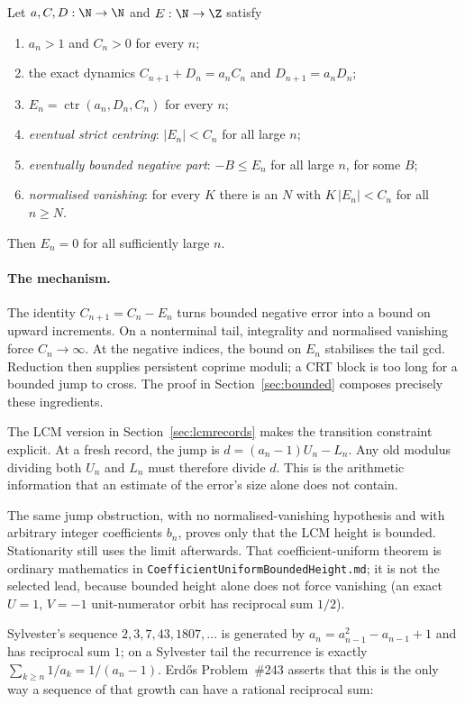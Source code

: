\documentclass[11pt]{article}
\newcommand{\ctr}{\operatorname{ctr}}
\begin{document}
\begin{theorem}\label{res:bounded}
Let $a,C,D:\N\to\N$ and $E:\N\to\Z$ satisfy
\begin{enumerate}
\item $a_n>1$ and $C_n>0$ for every $n$;
\item the exact dynamics $C_{n+1}+D_n=a_nC_n$ and $D_{n+1}=a_nD_n$;
\item $E_n=\ctr(a_n,D_n,C_n)$ for every $n$;
\item \emph{eventual strict centring}: $|E_n|<C_n$ for all large $n$;
\item \emph{eventually bounded negative part}: $-B\le E_n$ for all large $n$,
for some $B$;
\item \emph{normalised vanishing}: for every $K$ there is an $N$ with
$K\,|E_n|<C_n$ for all $n\ge N$.
\end{enumerate}
Then $E_n=0$ for all sufficiently large $n$.
\end{theorem}


\paragraph{The mechanism.}
The identity $C_{n+1}=C_n-E_n$ turns bounded negative error into a bound on
upward increments.  On a nonterminal tail, integrality and normalised
vanishing force $C_n\to\infty$.  At the negative indices, the bound on $E_n$
stabilises the tail gcd.  Reduction then supplies persistent coprime moduli;
a CRT block is too long for a bounded jump to cross.  The proof in
Section~\ref{sec:bounded} composes precisely these ingredients.

The LCM version in Section~\ref{sec:lcmrecords} makes the transition
constraint explicit.  At a fresh record, the jump is
$d=(a_n-1)U_n-L_n$.  Any old modulus dividing both $U_n$ and $L_n$ must
therefore divide $d$.  This is the arithmetic information that an estimate
of the error's size alone does not contain.

The same jump obstruction, with no normalised-vanishing hypothesis and with
arbitrary integer coefficients $b_n$, proves only that the LCM height is
bounded.  Stationarity still uses the limit afterwards.  That
coefficient-uniform theorem is ordinary mathematics in
\texttt{CoefficientUniformBoundedHeight.md}; it is not the selected lead,
because bounded height alone does not force vanishing (an exact $U=1$,
$V=-1$ unit-numerator orbit has reciprocal sum $1/2$).


Sylvester's sequence $2,3,7,43,1807,\ldots$ is generated by
$a_{n}=a_{n-1}^{2}-a_{n-1}+1$ and has reciprocal sum $1$; on a Sylvester
tail the recurrence is exactly $\sum_{k\ge n}1/a_k=1/(a_n-1)$.
Erd\H{o}s Problem~\#243 asserts that this is the only way a sequence of that
growth can have a rational reciprocal sum:
\end{document}
